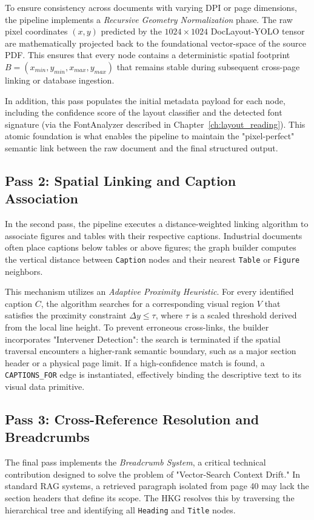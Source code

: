 To ensure consistency across documents with varying DPI or page dimensions, the pipeline implements a \textit{Recursive Geometry Normalization} phase. The raw pixel coordinates $(x, y)$ predicted by the $1024 \times 1024$ DocLayout-YOLO tensor are mathematically projected back to the foundational vector-space of the source PDF. This ensures that every node contains a deterministic spatial footprint $B = (x_{min}, y_{min}, x_{max}, y_{max})$ that remains stable during subsequent cross-page linking or database ingestion.

In addition, this pass populates the initial metadata payload for each node, including the confidence score of the layout classifier and the detected font signature (via the FontAnalyzer described in Chapter~\ref{ch:layout_reading}). This atomic foundation is what enables the pipeline to maintain the "pixel-perfect" semantic link between the raw document and the final structured output.

\subsection{Pass 2: Spatial Linking and Caption Association}
In the second pass, the pipeline executes a distance-weighted linking algorithm to associate figures and tables with their respective captions. Industrial documents often place captions below tables or above figures; the graph builder computes the vertical distance between \texttt{Caption} nodes and their nearest \texttt{Table} or \texttt{Figure} neighbors.

This mechanism utilizes an \textit{Adaptive Proximity Heuristic}. For every identified caption $C$, the algorithm searches for a corresponding visual region $V$ that satisfies the proximity constraint $\Delta y \le \tau$, where $\tau$ is a scaled threshold derived from the local line height. To prevent erroneous cross-links, the builder incorporates "Intervener Detection": the search is terminated if the spatial traversal encounters a higher-rank semantic boundary, such as a major section header or a physical page limit. If a high-confidence match is found, a \texttt{CAPTIONS\_FOR} edge is instantiated, effectively binding the descriptive text to its visual data primitive.

\subsection{Pass 3: Cross-Reference Resolution and Breadcrumbs}
The final pass implements the \textit{Breadcrumb System}, a critical technical contribution designed to solve the problem of "Vector-Search Context Drift." In standard RAG systems, a retrieved paragraph isolated from page 40 may lack the section headers that define its scope. The HKG resolves this by traversing the hierarchical tree and identifying all \texttt{Heading} and \texttt{Title} nodes.


